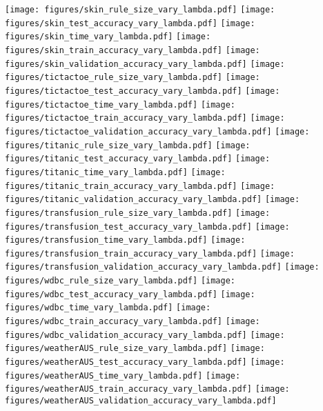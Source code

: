 \begin{figure*}


\texttt{[image: figures/skin\_rule\_size\_vary\_lambda.pdf]}
\texttt{[image: figures/skin\_test\_accuracy\_vary\_lambda.pdf]}
\texttt{[image: figures/skin\_time\_vary\_lambda.pdf]}
\texttt{[image: figures/skin\_train\_accuracy\_vary\_lambda.pdf]}
\texttt{[image: figures/skin\_validation\_accuracy\_vary\_lambda.pdf]}
\texttt{[image: figures/tictactoe\_rule\_size\_vary\_lambda.pdf]}
\texttt{[image: figures/tictactoe\_test\_accuracy\_vary\_lambda.pdf]}
\texttt{[image: figures/tictactoe\_time\_vary\_lambda.pdf]}
\texttt{[image: figures/tictactoe\_train\_accuracy\_vary\_lambda.pdf]}
\texttt{[image: figures/tictactoe\_validation\_accuracy\_vary\_lambda.pdf]}
\texttt{[image: figures/titanic\_rule\_size\_vary\_lambda.pdf]}
\texttt{[image: figures/titanic\_test\_accuracy\_vary\_lambda.pdf]}
\texttt{[image: figures/titanic\_time\_vary\_lambda.pdf]}
\texttt{[image: figures/titanic\_train\_accuracy\_vary\_lambda.pdf]}
\texttt{[image: figures/titanic\_validation\_accuracy\_vary\_lambda.pdf]}
\texttt{[image: figures/transfusion\_rule\_size\_vary\_lambda.pdf]}
\texttt{[image: figures/transfusion\_test\_accuracy\_vary\_lambda.pdf]}
\texttt{[image: figures/transfusion\_time\_vary\_lambda.pdf]}
\texttt{[image: figures/transfusion\_train\_accuracy\_vary\_lambda.pdf]}
\texttt{[image: figures/transfusion\_validation\_accuracy\_vary\_lambda.pdf]}
\texttt{[image: figures/wdbc\_rule\_size\_vary\_lambda.pdf]}
\texttt{[image: figures/wdbc\_test\_accuracy\_vary\_lambda.pdf]}
\texttt{[image: figures/wdbc\_time\_vary\_lambda.pdf]}
\texttt{[image: figures/wdbc\_train\_accuracy\_vary\_lambda.pdf]}
\texttt{[image: figures/wdbc\_validation\_accuracy\_vary\_lambda.pdf]}
\texttt{[image: figures/weatherAUS\_rule\_size\_vary\_lambda.pdf]}
\texttt{[image: figures/weatherAUS\_test\_accuracy\_vary\_lambda.pdf]}
\texttt{[image: figures/weatherAUS\_time\_vary\_lambda.pdf]}
\texttt{[image: figures/weatherAUS\_train\_accuracy\_vary\_lambda.pdf]}
\texttt{[image: figures/weatherAUS\_validation\_accuracy\_vary\_lambda.pdf]}
\end{figure*}
















